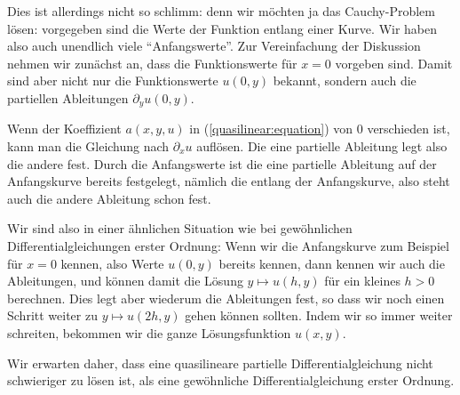 Dies ist allerdings nicht so schlimm: denn wir möchten ja das Cauchy-Problem
lösen: vorgegeben sind die Werte der Funktion entlang einer Kurve.
Wir haben also auch unendlich viele ``Anfangswerte''.
Zur Vereinfachung der Diskussion nehmen wir zunächst an, dass die
Funktionswerte für $x=0$ vorgeben sind.
Damit sind aber nicht nur die Funktionswerte $u(0,y)$ bekannt, sondern
auch die partiellen Ableitungen $\partial_yu(0,y)$.

Wenn der Koeffizient $a(x,y,u)$
in (\ref{quasilinear:equation})
von $0$ verschieden ist, kann man die Gleichung
nach $\partial_xu$ auflösen.
Die eine partielle Ableitung legt also die andere fest.
Durch die Anfangswerte ist die eine partielle Ableitung auf der
Anfangskurve bereits festgelegt, nämlich die entlang der Anfangskurve,
also steht auch die andere Ableitung schon fest.

Wir sind also in einer ähnlichen Situation wie bei gewöhnlichen
Differentialgleichungen erster Ordnung: Wenn wir die 
Anfangskurve zum Beispiel für $x=0$ kennen, also Werte
$u(0,y)$ bereits kennen, dann kennen wir
auch die Ableitungen, und können damit die Lösung
$y\mapsto u(h, y)$ für ein kleines $h>0$ berechnen. Dies legt aber
wiederum die Ableitungen fest, so dass wir noch einen Schritt 
weiter zu $y\mapsto u(2h,y)$ gehen können sollten.
Indem wir so immer weiter schreiten, bekommen wir die ganze
Lösungsfunktion $u(x,y)$.

Wir erwarten daher, dass eine quasilineare partielle Differentialgleichung
nicht schwieriger zu lösen ist, als eine gewöhnliche Differentialgleichung
erster Ordnung.

